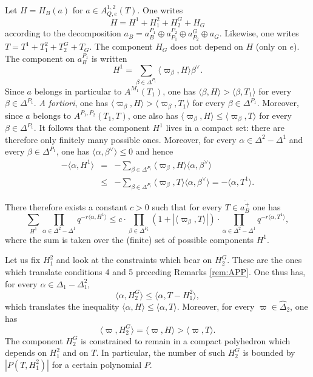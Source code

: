 \begin{paragr}
Let $H=H_B(a)$ for $a\in A^{1,2}_{Q,e}(T)$. One writes
$$H=H^1+H_1^2+H_2^G+H_G$$
according to the decomposition $a_B=a_B^{P_1}\oplus a_{P_1}^{P_2}\oplus a_{P_2}^G\oplus a_G$. Likewise, one writes $T=T^1+T_1^2+T_2^G+T_G$. The component $H_G$ does not depend on $H$ (only on $e$). The component on $a_B^{P_1}$ is written
$$H^1=\sum_{\beta\in \Delta^{P_1}} \langle \varpi_\beta, H\rangle \beta^\vee.$$
Since $a$ belongs in particular to $A^{M_1}(T_1)$, one has $\langle \beta,H\rangle > \langle \beta,T_1\rangle$ for every $\beta\in \Delta^{P_1}$. \emph{A fortiori}, one has $\langle \varpi_\beta,H\rangle > \langle \varpi_\beta,T_1\rangle$ for every $\beta\in \Delta^{P_1}$. Moreover, since $a$ belongs to $A^{P_1,P_2}(T_1,T)$, one also has $\langle \varpi_\beta,H\rangle \leq \langle \varpi_\beta,T\rangle$ for every $\beta\in \Delta^{P_1}$. It follows that the component $H^1$ lives in a compact set: there are therefore only finitely many possible ones. Moreover, for every $\alpha\in \Delta^2-\Delta^1$ and every $\beta\in \Delta^{P_1}$, one has $\langle \alpha,\beta^\vee\rangle \leq 0$ and hence
\begin{eqnarray*}
  -\langle \alpha,H^1\rangle&=&-\sum_{\beta\in \Delta^{P_1}} \langle \varpi_\beta,H\rangle \langle \alpha,\beta^\vee\rangle\\
  &\leq& -\sum_{\beta\in \Delta^{P_1}} \langle \varpi_\beta,T\rangle \langle \alpha,\beta^\vee\rangle=-\langle \alpha,T^1\rangle.
\end{eqnarray*}

There therefore exists a constant $c>0$ such that for every $T\in \overline{a_B^+}$ one has
\begin{equation}
  \label{eq:somme-H1}
  \sum_{H^1} \prod_{\alpha\in \Delta^2-\Delta^1} q^{-r\langle \alpha,H^1\rangle}\leq c\cdot \prod_{\beta\in \Delta^{P_1}} (1+|\langle \varpi_\beta,T\rangle|)\cdot \prod_{\alpha\in \Delta^2-\Delta^1} q^{-r\langle \alpha,T^1\rangle},
\end{equation}
where the sum is taken over the (finite) set of possible components $H^1$.

Let us fix $H_1^2$ and look at the constraints which bear on $H_2^G$. These are the ones which translate conditions 4 and 5 preceding Remarks \ref{rem:APP}. One thus has, for every $\alpha\in \Delta_1-\Delta_1^2$,
$$\langle \alpha,H_2^G\rangle \leq \langle \alpha,T-H_1^2\rangle,$$
which translates the inequality $\langle \alpha,H\rangle \leq \langle \alpha,T\rangle$. Moreover, for every $\varpi\in \hat{\Delta}_2$, one has
$$\langle \varpi,H_2^G\rangle =\langle \varpi,H\rangle > \langle \varpi,T\rangle.$$
The component $H_2^G$ is constrained to remain in a compact polyhedron which depends on $H_1^2$ and on $T$. In particular, the number of such $H_2^G$ is bounded by $|P(T,H_1^2)|$ for a certain polynomial $P$.


\end{paragr}
